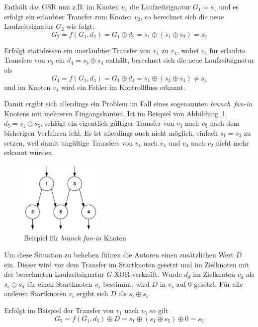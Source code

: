 \documentclass[11pt]{article}
\begin{document}
Enthält das GSR nun z.B. im Knoten $ v_1 $ die Laufzeitsignatur $ G_1 = s_1 $ und
es erfolgt ein erlaubter Transfer zum Knoten $ v_2 $, so berechnet sich die neue
Laufzeitsignatur $ G_2 $ wie folgt: $$ G_2 = f(G_1, d_2) = G_1 \oplus d_2 = s_1
\oplus (s_1 \oplus s_2) = s_2 $$

Erfolgt stattdessen ein unerlaubter Transfer von $ v_1 $ zu $ v_4 $, wobei
$ v_4 $ für erlaubte Transfers von $ v_3 $ ein $ d_4 = s_3 \oplus s_4
$ enthält, berechnet sich die neue Laufzeitsignatur als $$ G_4 = f(G_1, d_4)
= G_1 \oplus d_4 = s_1 \oplus (s_3 \oplus s_4) \neq s_4 $$ und im Knoten $v_4$
wird ein Fehler im Kontrollfluss erkannt.

Damit ergibt sich allerdings ein Problem im Fall eines sogenannten
\mbox{\emph{branch fan-in}} Knotens mit mehreren Eingangskanten. Ist im
Beispiel von Abbildung~\ref{fig:fanin-node} $ d_5 = s_1 \oplus s_5 $, schlägt
ein eigentlich gültiger Transfer von $ v_3 $ nach $ v_5 $ nach dem bisherigen
Verfahren fehl. Es ist allerdings auch nicht möglich, einfach $ s_1 = s_3 $ zu
setzen, weil damit ungültige Transfers von $ v_1 $ nach $ v_4 $ und $ v_3
$ nach $ v_2 $ nicht mehr erkannt würden.

\begin{figure}
  \centering
  \includegraphics[width=0.35\textwidth]{fanin-node}
  \caption{Beispiel für \emph{branch fan-in} Knoten}
  \label{fig:fanin-node}
\end{figure}

Um diese Situation zu beheben führen die Autoren einen zusätzlichen Wert
$ D $ ein. Dieser wird vor dem Transfer im Startknoten gesetzt und im
Zielknoten mit der berechneten Laufzeitsignatur $ G $ XOR-verknüft.  Wurde
$ d_d $ im Zielknoten $ v_d $ als $ s_s \oplus s_d $ für einen Startknoten
$ v_s $ bestimmt, wird $ D $ in $ v_s $ auf $ 0 $ gesetzt. Für alle anderen
Startknoten $ v_i $ ergibt sich $ D $ als $ s_i \oplus s_s $.

Erfolgt im Beispiel der Transfer von $ v_1 $ nach $ v_5 $ so gilt $$ G_5
= f(G_1, d_5) \oplus D = s_1 \oplus (s_1 \oplus s_5) \oplus 0 = s_5 $$
\end{document}
